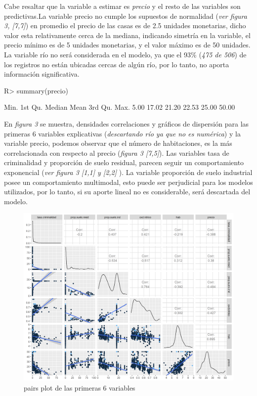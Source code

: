 \documentclass[nojss]{jss}
\begin{document}
Cabe resaltar que la variable a estimar es \textit{precio} y el resto de las variables son predictivas.La variable precio no cumple los supuestos de normalidad (\textit{ver figura 3,  [7,7]}) en promedio el precio de las casas es de 2.5 unidades monetarias, dicho valor esta relativamente cerca de la mediana, indicando simetría en la variable, el precio mínimo es de 5 unidades monetarias, y el valor máximo es de 50 unidades. La variable río no será considerada en el modelo, ya que el 93\% (\textit{475 de 506}) de los registros no están ubicadas cercas de algún río, por lo tanto, no aporta información significativa.
 
\begin{CodeChunk}
\begin{CodeInput}
   R> summary(precio)
\end{CodeInput}

\begin{CodeOutput}
	Min.  1st Qu.  Median  Mean   3rd Qu.  Max. 
	5.00   17.02   21.20   22.53   25.00   50.00 
\end{CodeOutput}
\end{CodeChunk}

En \textit{figura 3} se muestra, densidades correlaciones y gráficos de dispersión para las primeras 6 variables explicativas (\textit{descartando río ya que no es numérica}) y la variable precio, podemos observar que el número de habitaciones, es la más correlacionada con respecto al precio (\textit{figura 3 [7,5]}). Las variables tasa de criminalidad y proporción de suelo residual, parecen seguir un comportamiento exponencial (\textit{ver figura 3 [1,1] y [2,2]} ). La variable proporción de suelo industrial posee un comportamiento multimodal, esto puede ser perjudicial para los modelos utilizados, por lo tanto, si su aporte lineal no es considerable, será descartada del modelo.  
  
\begin{figure}[H]
	\centering
	\includegraphics[scale=1]{images/pairs1-1}
	\caption[pairs]{pairs plot de las primeras 6 variables}
	\label{fig:fig3}
\end{figure}  
\end{document}
